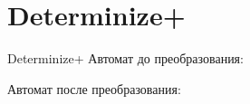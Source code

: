 \section{Determinize+}
\begin{frame}{Determinize+}
	Автомат до преобразования:


	Автомат после преобразования:


\end{frame}
